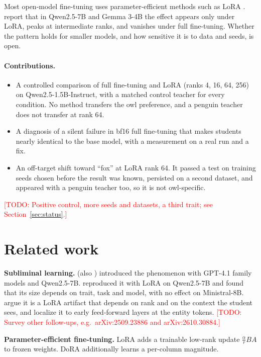 \documentclass[10pt,twocolumn,letterpaper]{article}
\newcommand{\todo}[1]{\textcolor{red}{[TODO: #1]}}
\begin{document}
Most open-model fine-tuning uses parameter-efficient methods such as LoRA \citep{hu2022lora}. \citet{nief2026lora} report that in Qwen2.5-7B and Gemma 3-4B the effect appears only under LoRA, peaks at intermediate ranks, and vanishes under full fine-tuning. Whether the pattern holds for smaller models, and how sensitive it is to data and seeds, is open.

\paragraph{Contributions.}
\begin{itemize}
\item A controlled comparison of full fine-tuning and LoRA (ranks 4, 16, 64, 256) on Qwen2.5-1.5B-Instruct, with a matched control teacher for every condition. No method transfers the owl preference, and a penguin teacher does not transfer at rank 64.
\item A diagnosis of a silent failure in bf16 full fine-tuning that makes students nearly identical to the base model, with a measurement on a real run and a fix.
\item An off-target shift toward ``fox'' at LoRA rank 64. It passed a test on training seeds chosen before the result was known, persisted on a second dataset, and appeared with a penguin teacher too, so it is not owl-specific.
\end{itemize}
\noindent\todo{Positive control, more seeds and datasets, a third trait; see Section~\ref{sec:status}.}

\section{Related work}
\textbf{Subliminal learning.} \citet{cloud2025subliminal} (also \citep{cloud2026nature}) introduced the phenomenon with GPT-4.1 family models and Qwen2.5-7B. \citet{vanderweijden2026reproducing} reproduced it with LoRA on Qwen2.5-7B and found that its size depends on trait, task and model, with no effect on Ministral-8B. \citet{nief2026lora} argue it is a LoRA artifact that depends on rank and on the context the student sees, and localize it to early feed-forward layers at the entity tokens. \todo{Survey other follow-ups, e.g.\ arXiv:2509.23886 and arXiv:2610.30884.}

\textbf{Parameter-efficient fine-tuning.} LoRA \citep{hu2022lora} adds a trainable low-rank update $\frac{\alpha}{r}BA$ to frozen weights. DoRA \citep{liu2024dora} additionally learns a per-column magnitude.
\end{document}
